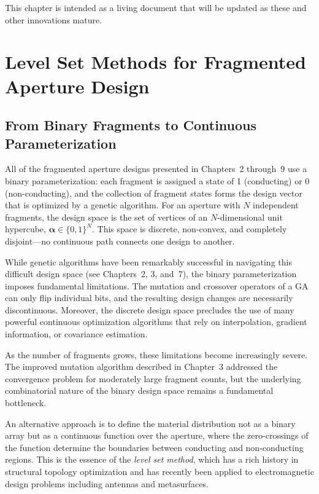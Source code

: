 This chapter is intended as a living document that will be updated as these and other innovations mature.


\section{Level Set Methods for Fragmented Aperture Design}

\subsection{From Binary Fragments to Continuous Parameterization}

All of the fragmented aperture designs presented in Chapters~2 through~9 use a binary parameterization: each fragment is assigned a state of 1 (conducting) or 0 (non-conducting), and the collection of fragment states forms the design vector that is optimized by a genetic algorithm.  For an aperture with $N$ independent fragments, the design space is the set of vertices of an $N$-dimensional unit hypercube, $\boldsymbol{\alpha} \in \{0, 1\}^N$.  This space is discrete, non-convex, and completely disjoint---no continuous path connects one design to another.

While genetic algorithms have been remarkably successful in navigating this difficult design space (see Chapters~2, 3, and~7), the binary parameterization imposes fundamental limitations.  The mutation and crossover operators of a GA can only flip individual bits, and the resulting design changes are necessarily discontinuous.  Moreover, the discrete design space precludes the use of many powerful continuous optimization algorithms that rely on interpolation, gradient information, or covariance estimation.

As the number of fragments grows, these limitations become increasingly severe.  The improved mutation algorithm described in Chapter~3 addressed the convergence problem for moderately large fragment counts, but the underlying combinatorial nature of the binary design space remains a fundamental bottleneck.

An alternative approach is to define the material distribution not as a binary array but as a continuous function over the aperture, where the zero-crossings of the function determine the boundaries between conducting and non-conducting regions.  This is the essence of the \emph{level set method}, which has a rich history in structural topology optimization \cite{Guirguis2016DerivativeFree, Guirguis2018HighResolution} and has recently been applied to electromagnetic design problems including antennas and metasurfaces.

